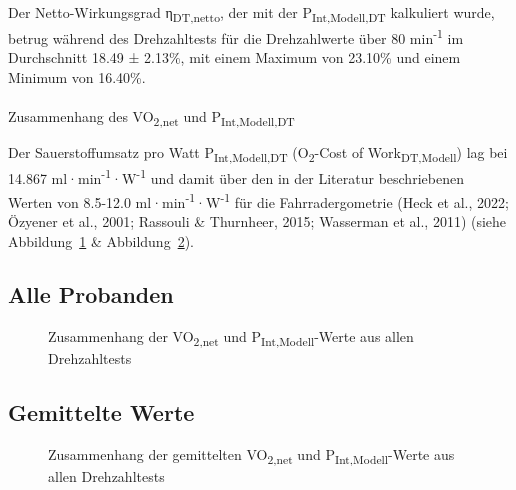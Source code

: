 \documentclass[
  letterpaper,
  DIV=11]{scrartcl}
\makeatletter
\let\oldparagraph\paragraph
\renewcommand{\paragraph}{
    \@ifstar
      \xxxParagraphStar
      \xxxParagraphNoStar
  }
\newcommand{\xxxParagraphStar}[1]{\oldparagraph*{#1}\mbox{}}
\newcommand{\xxxParagraphNoStar}[1]{\oldparagraph{#1}\mbox{}}
\makeatother
\begin{document}
Der Netto-Wirkungsgrad η\textsubscript{DT,netto}, der mit der
P\textsubscript{Int,Modell,DT} kalkuliert wurde, betrug während des
Drehzahltests für die Drehzahlwerte über 80 min\textsuperscript{-1} im
Durchschnitt 18.49 ± 2.13\%, mit einem Maximum von 23.10\% und einem
Minimum von 16.40\%.

\paragraph{\texorpdfstring{Zusammenhang des VO\textsubscript{2,net} und
P\textsubscript{Int,Modell,DT}}{Zusammenhang des VO2,net und PInt,Modell,DT}}\label{zusammenhang-des-vo2net-und-pintmodelldt}

Der Sauerstoffumsatz pro Watt P\textsubscript{Int,Modell,DT}
(O\textsubscript{2}-Cost of Work\textsubscript{DT,Modell}) lag bei
14.867 ml·min\textsuperscript{-1}·W\textsuperscript{-1} und damit über
den in der Literatur beschriebenen Werten von 8.5-12.0
ml·min\textsuperscript{-1}·W\textsuperscript{-1} für die
Fahrradergometrie (Heck et al., 2022; Özyener et al., 2001; Rassouli \&
Thurnheer, 2015; Wasserman et al., 2011) (siehe
Abbildung~\ref{fig-DT_O2cost_all} \&
Abbildung~\ref{fig-DT_O2cost_mean}).

\subsection{Alle Probanden}

\begin{figure}


\caption{\label{fig-DT_O2cost_all}Zusammenhang der
VO\textsubscript{2,net} und P\textsubscript{Int,Modell}-Werte aus allen
Drehzahltests}

\end{figure}%

\subsection{Gemittelte Werte}

\begin{figure}


\caption{\label{fig-DT_O2cost_mean}Zusammenhang der gemittelten
VO\textsubscript{2,net} und P\textsubscript{Int,Modell}-Werte aus allen
Drehzahltests}

\end{figure}%
\end{document}
